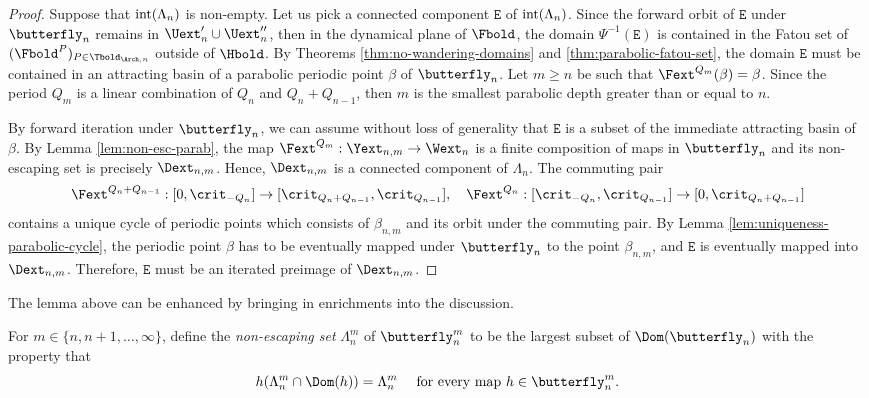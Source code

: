 \documentclass{amsart}
\begin{document}
\begin{proof}
    Suppose that $\textnormal{int}(\Lambda_n)$ is non-empty. 
    Let us pick a connected component $\mathtt{E}$ of $\textnormal{int}(\Lambda_n)$. 
    Since the forward orbit of $\mathtt{E}$ under $\butterfly_n$ remains in $\Uext'_n \cup \Uext''_n$, then in the dynamical plane of $\Fbold$, the domain $\Psi^{-1}(\mathtt{E})$ is contained in the Fatou set of $(\Fbold^P)_{P \in \Tbold_{\Arch,n}}$ outside of $\Hbold$. 
    By Theorems \ref{thm:no-wandering-domains} and \ref{thm:parabolic-fatou-set}, the domain $\mathtt{E}$ must be contained in an attracting basin of a parabolic periodic point $\beta$ of $\butterfly_n$.
    Let $m \geq n$ be such that $\Fext^{Q_m}(\beta) = \beta$. 
    Since the period $Q_m$ is a linear combination of $Q_n$ and $Q_n+Q_{n-1}$, then $m$ is the smallest parabolic depth greater than or equal to $n$.
    
    By forward iteration under $\butterfly_n$, we can assume without loss of generality that $\mathtt{E}$ is a subset of the immediate attracting basin of $\beta$. 
    By Lemma \ref{lem:non-esc-parab}, the map $\Fext^{Q_m}: \Yext_{n,m} \to \Wext_n$ is a finite composition of maps in $\butterfly_n$ and its non-escaping set is precisely $\Dext_{n,m}$. Hence, $\Dext_{n,m}$ is a connected component of $\Lambda_n$. 
    The commuting pair
    \[
        \Fext^{Q_n+Q_{n-1}} : [0,\crit_{-Q_n}] \to [\crit_{Q_n+Q_{n-1}}, \crit_{Q_{n-1}}], \quad
        \Fext^{Q_n} : [\crit_{-Q_n}, \crit_{Q_{n-1}}] \to [0, \crit_{Q_n+Q_{n-1}}]
    \]
    contains a unique cycle of periodic points which consists of $\beta_{n,m}$ and its orbit under the commuting pair. 
    By Lemma \ref{lem:uniqueness-parabolic-cycle}, the periodic point $\beta$ has to be eventually mapped under $\butterfly_n$ to the point $\beta_{n,m}$, and $\mathtt{E}$ is eventually mapped into $\Dext_{n,m}$.
    Therefore, $\mathtt{E}$ must be an iterated preimage of $\Dext_{n,m}$.
\end{proof}

The lemma above can be enhanced by bringing in enrichments into the discussion. 

\begin{definition}
    For $m \in \{n, n+1, \ldots, \infty\}$, define the \emph{non-escaping set} $\Lambda_n^m$ of $\butterfly_n^m$ to be the largest subset of $\Dom(\butterfly_{n})$ with the property that 
\[
    h(\Lambda_n^m \cap \Dom(h)) = \Lambda_n^m \quad \text{ for every map } h \in \butterfly_n^m. 
\]
\end{definition}
\end{document}
